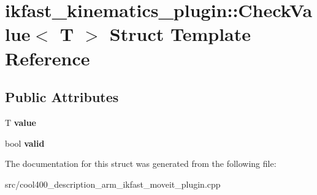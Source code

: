 \section{ikfast\-\_\-kinematics\-\_\-plugin\-:\-:Check\-Value$<$ T $>$ Struct Template Reference}
\label{structikfast__kinematics__plugin_1_1_check_value}
\subsection*{Public Attributes}
\begin{DoxyCompactItemize}
\item 
T {\bfseries value}\label{structikfast__kinematics__plugin_1_1_check_value_ad8a31cd6836e64a2a9894bae42718322}

\item 
bool {\bfseries valid}\label{structikfast__kinematics__plugin_1_1_check_value_a69035cccc4f9f7e2404595bbb595f4b5}

\end{DoxyCompactItemize}


The documentation for this struct was generated from the following file\-:\begin{DoxyCompactItemize}
\item 
src/cool400\-\_\-description\-\_\-arm\-\_\-ikfast\-\_\-moveit\-\_\-plugin.\-cpp\end{DoxyCompactItemize}
